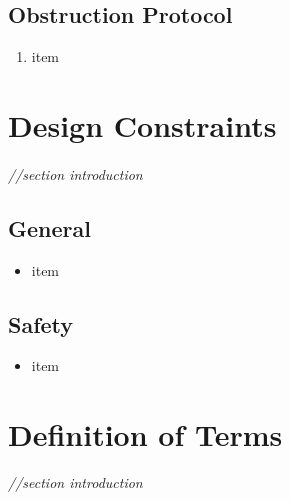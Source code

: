 \documentclass[12pt]{article}
\begin{document}
	\subsection{Obstruction Protocol} 
	\begin{enumerate}
		\item item
	\end{enumerate}

\section{Design Constraints} %
\label{con}
\paragraph{} \textit{//section introduction}
	\subsection{General}
	\begin{itemize}
		\item item
	\end{itemize}
	
	\subsection{Safety}
	\begin{itemize}
		\item item
	\end{itemize}

\section{Definition of Terms} %
\label{def}
\textit{//section introduction}

\end{document}
